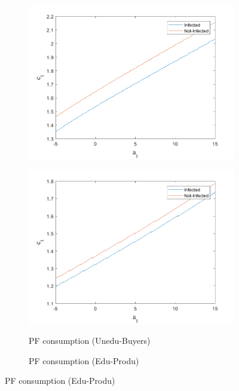 \begin{figure}[H]
\begin{subfigure}{0.5\textwidth}
   \includegraphics[width=\linewidth,height = 0.22\textheight]{figures/mio/FIG6.png}
    \label{fig_dert}
\end{subfigure}
\hspace*{\fill}
\begin{subfigure}{0.5\textwidth}\caption{PF consumption (Unedu-Buyers)}
   \includegraphics[width=\linewidth,height = 0.22\textheight]{figures/mio/FIG5.png}
    \label{fig:x_b}
\end{subfigure}
\bigskip
\begin{subfigure}{0.5\textwidth}\caption{PF consumption (Edu-Produ)}

\end{subfigure}
\end{figure}
